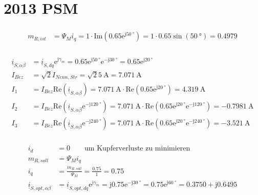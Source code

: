 \documentclass[11pt,a4paper]{scrartcl}
\newcommand{\mybr}[1]{\left(#1\right)}
\renewcommand{\j}{\mathrm{j}}
\renewcommand{\i}{\underline{i}}
\newcommand{\0}{_{\mybr{0}}}
\newcommand{\1}{_{\mybr{1}}}
\newcommand{\2}{_{\mybr{2}}}
\renewcommand{\e}{\mathrm{e}}
\renewcommand{\Re}{\mathrm{Re}}
\renewcommand{\Im}{\mathrm{Im}}
\newcommand{\isab}{\i_{S,\alpha\beta}}
\newcommand{\isdq}{\i_{S,dq}}
\begin{document}
\clearpage

\part{2013 PSM}
\section{}
\begin{align}
m_{R,ist}&=\Psi_M i_q=1\cdot\Im\mybr{\num{0.65}\e^{\j\SI{50}{\degree}}}=1\cdot\num{0.65}\sin\mybr{\SI{50}{\degree}}=\num{0.4979}
\end{align}
\section{}
\begin{align}
\isab&=\isdq\e^{\j\gamma_m}=\num{0.65}\e^{\j\SI{50}{\degree}}\e^{-\j\SI{30}{\degree}}=\num{0.65}\e^{\j\SI{20}{\degree}}\\
I_{Bez}&=\sqrt{2}I_{Nenn,Str}=\sqrt{2}\SI{5}{\ampere}=\SI{7.071}{\ampere}\\
I_1&=I_{Bez}\Re\mybr{\isab}=\SI{7.071}{\ampere}\cdot\Re\mybr{\num{0.65}\e^{\j\SI{20}{\degree}}}=\SI{4.319}{\ampere}\\
I_2&=I_{Bez}\Re\mybr{\isab\e^{-\j\SI{120}{\degree}}}=\SI{7.071}{\ampere}\cdot\Re\mybr{\num{0.65}\e^{\j\SI{20}{\degree}}\e^{-\j\SI{120}{\degree}}}=\SI{-0.7981}{\ampere}\\
I_3&=I_{Bez}\Re\mybr{\isab\e^{-\j\SI{240}{\degree}}}=\SI{7.071}{\ampere}\cdot\Re\mybr{\num{0.65}\e^{\j\SI{20}{\degree}}\e^{-\j\SI{240}{\degree}}}=\SI{-3.521}{\ampere}
\end{align}

\section{}
\begin{align}
i_d&=0\quad\quad\text{um Kupferverluste zu minimieren}\\
m_{R,soll}&=\Psi_M i_q\\
i_q&=\frac{m_{R,soll}}{\Psi_M}=\frac{\num{0.75}}{1}=\num{0.75}\\
\i_{S,opt,\alpha\beta}&=\i_{S,opt,dq}\e^{\j\gamma_m}=\j\num{0.75}\e^{-\j\SI{30}{\degree}}=\num{0.75}\e^{\j\SI{60}{\degree}}=\num{0.3750}+\j\num{0.6495}
\end{align}
\end{document}
